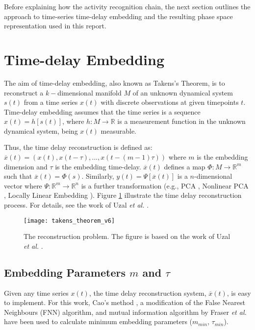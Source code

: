 \documentclass[10pt,journal,compsoc]{IEEEtran}
\begin{document}
Before explaining how the activity recognition chain, the next section outlines the approach to time-series 
time-delay embedding and the resulting phase space representation used in this report. 



\section{Time-delay Embedding}
The aim of time-delay embedding, also known as Takens's Theorem, is to reconstruct 
a $k-$dimensional manifold $M$ of an unknown dynamical system $s(t)$ 
from a time series $x(t)$ with discrete observations at given timepoints $t$. 
Time-delay embedding assumes that the time series 
is a sequence $x(t)=h[s(t)]$,  where  $h: M \rightarrow \mathbb{R}$ 
is a measurement function in the unknown dynamical system, being $x(t)$ measurable.

Thus, the time delay reconstruction is defined as:
$\overline{x}(t) = (x(t), x(t-\tau),...,x(t-(m-1)\tau))$ 
where $m$ is the embedding dimension and $\tau$ is the embedding time-delay.
$\overline{x}(t)$ defines a map $\varPhi: M \rightarrow \mathbb{R}^m$ such that 
$\overline{x}(t) = \varPhi(s)$.
Similarly, $y(t)= \varPsi [\overline{x}(t)]$ is a $n$-dimensional vector 
where $\varPsi: \mathbb{R}^m \rightarrow \mathbb{R}^n$ is a further transformation 
(e.g., PCA \cite{Shlens2014}, Nonlinear PCA \cite{Kruger2007}, 
Locally Linear Embedding \cite{Roweis2000}). Figure \ref{fig:takens_theorem} 
illustrate the time delay reconstruction process.
For details, see the work of Uzal \emph{et al.} \cite{Uzal2011}.

\begin{figure}[!htb]
\centering    
 \texttt{[image: takens\_theorem\_v6]}
\caption[PA]{The reconstruction problem. The figure is based on the work of Uzal 
\emph{et al.} \cite{Uzal2011}.}
\label{fig:takens_theorem}
\end{figure}

\subsection{Embedding Parameters $m$ and $\tau$}
Given any time series $x(t)$, the time delay reconstruction system, $\overline{x}(t)$,
is easy to implement. For this work, Cao's method \cite{Cao1997}, a modification of the 
False Nearest Neighbours (FNN) algorithm, and mutual information algorithm by 
Fraser \emph{et al.} \cite{Fraser1986} have been used to calculate minimum embedding 
parameters ($m_{min}$, $\tau_{min}$).
\end{document}
